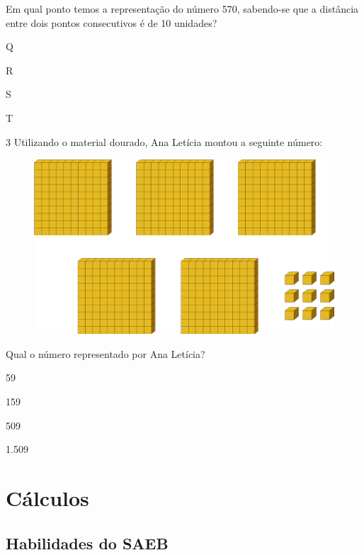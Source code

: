 Em qual ponto temos a representação do número 570, sabendo-se que a
distância entre dois pontos consecutivos é de 10 unidades?

\begin{escolha}
\item
  Q
\item
  R
\item
  S
\item
  T
\end{escolha}

\num{3} Utilizando o material dourado, Ana Letícia montou a seguinte número:

\begin{figure}[htpb!]
\centering
\includegraphics[width=\textwidth]{./media/image9.png}
\end{figure}

Qual o número representado por Ana Letícia?

\begin{escolha}
\item
  59
\item
  159
\item
  509
\item
  1.509
\end{escolha}


\chapter{Cálculos}

\section*{Habilidades do SAEB}

